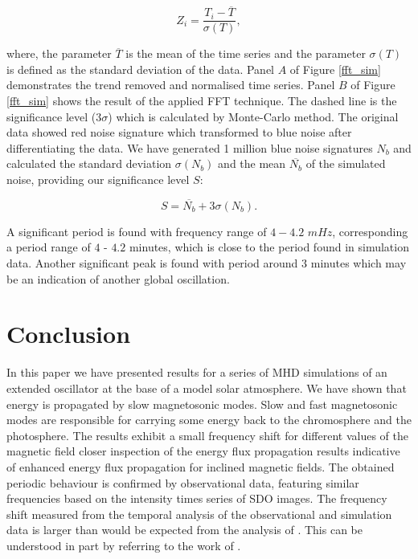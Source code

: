 \documentclass[twocolumn]{aastex62}
\begin{document}
\begin{equation}
	Z_{i} = \frac {T_{i} - \overline{T}}  {\sigma(T)},
	\label{z_score}
\end{equation}

where, the parameter $\overline{T}$ is the mean of the time series and the parameter $\sigma(T)$ is defined as the standard deviation of the data. Panel $A$ of Figure \ref{fft_sim} demonstrates the trend removed and normalised time series. Panel $B$ of Figure \ref{fft_sim} shows the result of the applied FFT technique. The dashed line is the significance level ($3 \sigma$) which is calculated by Monte-Carlo method. The original data showed red noise signature which transformed to blue noise after differentiating the data. We have generated 1 million blue noise signatures $N_{b}$ and calculated the standard deviation $\sigma(N_{b})$ and the mean $\overline{N_{b}}$ of the simulated noise, providing our significance level $S$:

\begin{equation}
    S = \overline{N_{b}} + 3 \sigma(N_{b}).
\end{equation}

A significant period is found with frequency range of $4-4.2$ $mHz$, corresponding a period range of $4$ - $4.2$ minutes, which is close to the period found in simulation data. Another significant peak is found with period around $3$ minutes which may be an indication of another global oscillation.

\section{Conclusion}

In this paper we have presented results for a series of MHD simulations of an extended oscillator at the base of a model solar atmosphere. We have shown that energy is propagated by slow magnetosonic modes. Slow and fast magnetosonic modes are responsible for carrying some energy back to the chromosphere and the photosphere. The results exhibit a small frequency shift  for different values of the magnetic field closer inspection of the energy flux propagation results indicative of enhanced energy flux propagation for inclined magnetic fields. The obtained periodic behaviour is confirmed by observational data, featuring similar frequencies based on the intensity times series of SDO images. The frequency shift measured from the temporal analysis of the observational and simulation data is larger than would be expected from the analysis of \citet{Hindman1996}. 
This can be understood in part by referring to the work of \citet{Campbell1989}.
\end{document}
